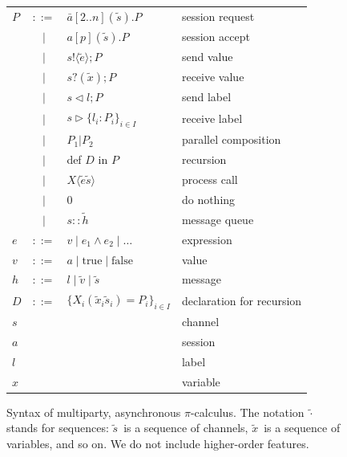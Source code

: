 \documentclass[a4paper,12pt,oneside,fleqn]{book} %
\newcommand*\llangle{\mathopen{\langle\!\langle}}
\newcommand*\rrangle{\mathclose{\rangle\!\rangle}}
\begin{document}
\begin{figure} %
\begin{center}
\begin{tabular}{lcll}
  $P$ & $::=$ & $\bar{a}[2..n](\tilde{s}).P$ & session request
  \\  & $\mid$ & $a[p](\tilde{s}).P$  & session accept
  \\ & $\mid$  & $s!\langle\tilde{e}\rangle;P$ & send value
  \\ & $\mid$ & $s?(\tilde{x});P$ & receive value
  \\ & $\mid$ & $s \triangleleft l; P$ & send label
  \\ & $\mid$ & $s \triangleright \{l_i:P_i\}_{i\in I}$ & receive label
  \\ & $\mid$ & $P_1|P_2$ & parallel composition
  \\ & $\mid$ & def $D$ in $P$ & recursion
  \\ & $\mid$ & $X\langle\tilde{e}\tilde{s}\rangle$ & process call
  \\ & $\mid$ & $0$ & do nothing
  \\ & $\mid$ & $s :: \tilde{h}$ & message queue
  \\
  $e$ & $::=$ & $v \mid e_1 \land e_2 \mid \ldots$ & expression
  \\
  $v$ & $::=$ & $a \mid \text{true} \mid \text{false}$ & value
  \\
  $h$ & $::=$ & $l \mid \tilde{v} \mid \tilde{s}$ & message
  \\
  $D$ & $::=$ & $\{X_i(\tilde{x}_i\tilde{s}_i)=P_i\}_{i\in I}$
    & declaration for recursion
  \\
  $s$ & & & channel
  \\
  $a$ & & & session
  \\
  $l$ & & & label
  \\
  $x$ & & & variable
\end{tabular}
\end{center}
\caption{
  Syntax of multiparty, asynchronous $\pi$-calculus.
  The notation $\tilde{\cdot}$ stands for sequences:
    $\tilde{s}$~is a sequence of channels,
    $\tilde{x}$~is a sequence of variables,
    and so on.
  We do not include higher-order features.
}
\label{fig:pi-calculus}
\end{figure} %
\end{document}
